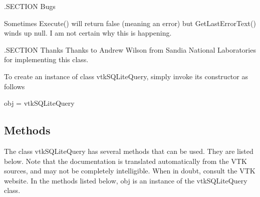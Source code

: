 .S\-E\-C\-T\-I\-O\-N Bugs

Sometimes Execute() will return false (meaning an error) but Get\-Last\-Error\-Text() winds up null. I am not certain why this is happening.

.S\-E\-C\-T\-I\-O\-N Thanks Thanks to Andrew Wilson from Sandia National Laboratories for implementing this class.

To create an instance of class vtk\-S\-Q\-Lite\-Query, simply invoke its constructor as follows \begin{DoxyVerb}  obj = vtkSQLiteQuery
\end{DoxyVerb}
 \hypertarget{vtkwidgets_vtkxyplotwidget_Methods}{}\subsection{Methods}\label{vtkwidgets_vtkxyplotwidget_Methods}
The class vtk\-S\-Q\-Lite\-Query has several methods that can be used. They are listed below. Note that the documentation is translated automatically from the V\-T\-K sources, and may not be completely intelligible. When in doubt, consult the V\-T\-K website. In the methods listed below, {\ttfamily obj} is an instance of the vtk\-S\-Q\-Lite\-Query class. 
